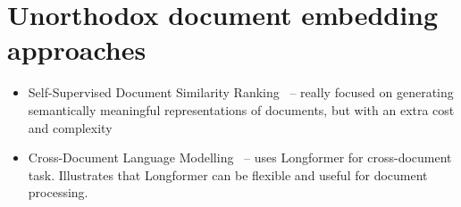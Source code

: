 \section{Unorthodox document embedding approaches}

\begin{itemize}

    \item Self-Supervised Document Similarity Ranking~\cite{ginzburg2021self} --
    really focused on generating semantically meaningful representations of
    documents, but with an extra cost and complexity


    \item Cross-Document Language Modelling~\cite{caciularu2021cdlm} -- uses
    Longformer for cross-document task. Illustrates that Longformer can be
    flexible and useful for document processing.

\end{itemize}

